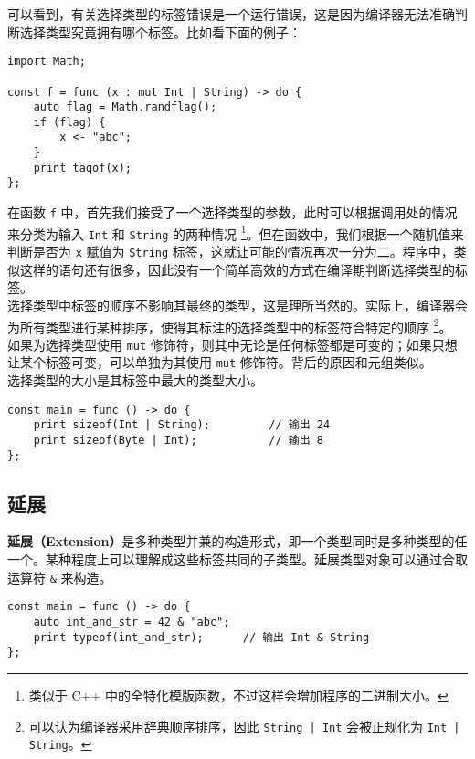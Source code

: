 可以看到，有关选择类型的标签错误是一个运行错误，这是因为编译器无法准确判断选择类型究竟拥有哪个标签。比如看下面的例子：

\begin{lstlisting}
import Math;

const f = func (x : mut Int | String) -> do {
    auto flag = Math.randflag();
    if (flag) {
        x <- "abc";
    }
    print tagof(x);
};
\end{lstlisting}

在函数 \lstinline!f! 中，首先我们接受了一个选择类型的参数，此时可以根据调用处的情况来分类为输入 \lstinline!Int! 和 \lstinline!String! 的两种情况 \footnote{类似于 C++ 中的全特化模版函数，不过这样会增加程序的二进制大小。}。但在函数中，我们根据一个随机值来判断是否为 \lstinline!x! 赋值为 \lstinline!String! 标签，这就让可能的情况再次一分为二。程序中，类似这样的语句还有很多，因此没有一个简单高效的方式在编译期判断选择类型的标签。 \\

选择类型中标签的顺序不影响其最终的类型，这是理所当然的。实际上，编译器会为所有类型进行某种排序，使得其标注的选择类型中的标签符合特定的顺序 \footnote{可以认为编译器采用辞典顺序排序，因此 \lstinline!String | Int! 会被正规化为 \lstinline!Int | String!。}。 \\

如果为选择类型使用 \lstinline!mut! 修饰符，则其中无论是任何标签都是可变的；如果只想让某个标签可变，可以单独为其使用 \lstinline!mut! 修饰符。背后的原因和元组类似。 \\

选择类型的大小是其标签中最大的类型大小。

\begin{lstlisting}
const main = func () -> do {
    print sizeof(Int | String);			// 输出 24
    print sizeof(Byte | Int);           // 输出 8
};
\end{lstlisting}


\subsection{延展}

\textbf{延展（Extension）}是多种类型并兼的构造形式，即一个类型同时是多种类型的任一个。某种程度上可以理解成这些标签共同的子类型。延展类型对象可以通过合取运算符 \lstinline!&! 来构造。

\begin{lstlisting}
const main = func () -> do {
    auto int_and_str = 42 & "abc";
    print typeof(int_and_str);      // 输出 Int & String
};
\end{lstlisting}

